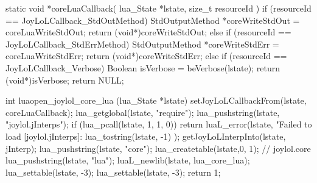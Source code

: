static void *coreLuaCallback(
  lua_State *lstate,
  size_t resourceId
) {
  if (resourceId == JoyLoLCallback_StdOutMethod) {
    StdOutputMethod *coreWriteStdOut =
      coreLuaWriteStdOut;
    return (void*)coreWriteStdOut;
  } else if (resourceId == JoyLoLCallback_StdErrMethod) {
    StdOutputMethod *coreWriteStdErr =
      coreLuaWriteStdErr;
    return (void*)coreWriteStdErr;
  } else if (resourceId == JoyLoLCallback_Verbose) {
    Boolean isVerbose = beVerbose(lstate);
    return (void*)isVerbose;
  }
  return NULL;
} 

int luaopen_joylol_core_lua (lua_State *lstate) {
  setJoyLoLCallbackFrom(lstate, coreLuaCallback);
  lua_getglobal(lstate, "require");
  lua_pushstring(lstate, "joylol.jInterps");
  if (lua_pcall(lstate, 1, 1, 0)) {
    return luaL_error(lstate,
      "Failed to load [joylol.jInterps]\nERROR:\n%
      lua_tostring(lstate, -1)
    );
  }
  getJoyLoLInterpInto(lstate, jInterp);
  lua_pushstring(lstate, "core");
  lua_createtable(lstate,0, 1); // joylol.core 
  lua_pushstring(lstate, "lua");
  luaL_newlib(lstate, lua_core_lua);
  lua_settable(lstate, -3);
  lua_settable(lstate, -3);
  return 1;
}
\stopCCode